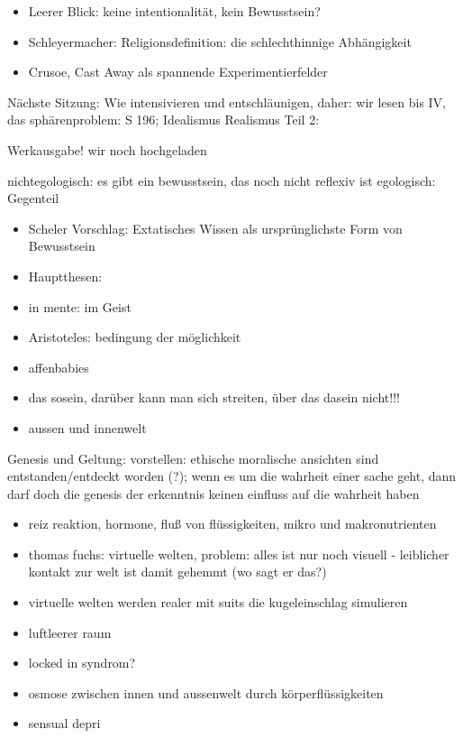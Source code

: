 \documentclass[emulatestandardclasses]{scrartcl}
\begin{document}
\begin{itemize}
  \item Leerer Blick: keine intentionalität, kein Bewusstsein?
  \item Schleyermacher: Religionsdefinition: die schlechthinnige Abhängigkeit 
  \item Crusoe, Cast Away als spannende Experimentierfelder
\end{itemize}

Nächste Sitzung: Wie intensivieren und entschläunigen, daher: wir lesen bis IV, das sphärenproblem: S 196; Idealismus Realismus Teil 2: 

Werkausgabe! wir noch hochgeladen

nichtegologisch: es gibt ein bewusstsein, das noch nicht reflexiv ist
egologisch: Gegenteil

\begin{itemize}
  \item Scheler Vorschlag: Extatisches Wissen als ursprünglichste Form von Bewusstsein
  \item Hauptthesen:
  \item in mente: im Geist
  \item Aristoteles: bedingung der möglichkeit 
  \item affenbabies 
  \item das sosein, darüber kann man sich streiten, über das dasein nicht!!!
  \item aussen und innenwelt 
\end{itemize}

Genesis und Geltung: vorstellen: ethische moralische ansichten sind entstanden/entdeckt worden (?); wenn es um die wahrheit einer sache geht, dann darf doch die genesis der erkenntnis keinen einfluss auf die wahrheit haben




\begin{itemize}
  \item reiz reaktion, hormone, fluß von flüssigkeiten, mikro und makronutrienten
  \item thomas fuchs: virtuelle welten, problem: alles ist nur noch visuell - leiblicher kontakt zur welt ist damit gehemmt (wo sagt er das?)
  \item virtuelle welten werden realer mit suits die kugeleinschlag simulieren
  \item luftleerer raum
  \item locked in syndrom?
  \item osmose zwischen innen und aussenwelt durch körperflüssigkeiten
  \item sensual depri
\end{itemize}
\end{document}
